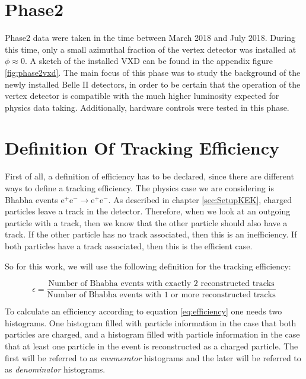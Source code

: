 \documentclass[a4paper,11pt,twosided,final,german,openbib,pdftex,listof=totoc,bibliography=totoc]{scrbook}
\begin{document}
\section{Phase2}
\label{sec:Phase2}

Phase2 data were taken in the time between March 2018 and July 2018. During this time, only a small azimuthal fraction of the vertex detector was installed at $\phi \approx 0$. A sketch of the installed VXD can be found in the appendix figure \ref{fig:phase2vxd}. The main focus of this phase was to study the background of the newly installed Belle II detectors, in order to be certain that the operation of the vertex detector is compatible with the much higher luminosity expected for physics data taking. Additionally, hardware controls were tested in this phase.


\section{Definition Of Tracking Efficiency}
\label{sec:Eff}

First of all, a definition of efficiency has to be declared, since there are different ways to define a tracking efficiency. The physics case we are considering is Bhabha events $ \textrm{e}^+ \textrm{e}^- \rightarrow \textrm{e}^+ \textrm{e}^- $. As described in chapter \ref{sec:SetupKEK}, charged particles leave a track in the detector. Therefore, when we look at an outgoing particle with a track, then we know that the other particle should also have a track. If the other particle has no track associated, then this is an inefficiency. If both particles have a track associated, then this is the efficient case.

So for this work, we will use the following definition for the tracking efficiency:

\begin{equation}
	\epsilon = \frac{\textrm{Number of Bhabha events with exactly 2 reconstructed tracks}}{\textrm{Number of Bhabha events with 1 or more reconstructed tracks}}
	\label{eq:efficiency}
\end{equation}


To calculate an efficiency according to equation \ref{eq:efficiency} one needs two histograms. One histogram filled with particle information in the case that both particles are charged, and a histogram filled with particle information in the case that at least one particle in the event is reconstructed as a charged particle. The first will be referred to as \textit{enumerator} histograms and the later will be referred to as \textit{denominator} histograms.
\end{document}
